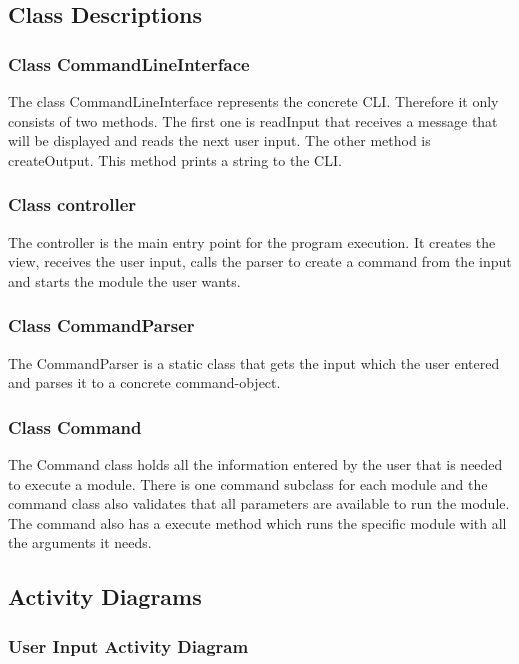 \documentclass[parskip=full]{scrartcl}
\begin{document}
\subsection{Class Descriptions}

\subsubsection{Class CommandLineInterface}
The class CommandLineInterface represents the concrete \gls{CLI}.
Therefore it only consists of two methods. 
The first one is readInput that receives a message that will be displayed and reads the next user input.
The other method is createOutput.
This method prints a string to the \gls{CLI}.

\subsubsection{Class controller}
The controller is the main entry point for the program execution. 
It creates the view, receives the user input, calls the parser to create a command from the input and starts the module the user wants.

\subsubsection{Class CommandParser}
The CommandParser is a static class that gets the input which the user entered and parses it to a concrete command-object.

\subsubsection{Class Command}
The Command class holds all the information entered by the user that is needed to execute a module.
There is one command subclass for each module and the command class also validates that all parameters are available to run the module.
The command also has a execute method which runs the specific module with all the arguments it needs.

\newpage

\subsection{Activity Diagrams}

\subsubsection{User Input Activity Diagram}
\end{document}
